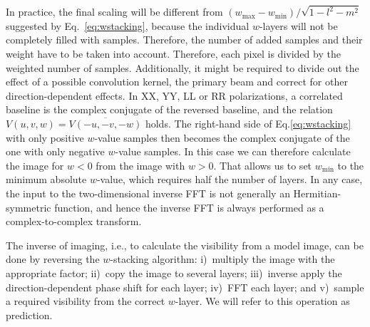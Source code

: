 \documentclass[useAMS,usenatbib]{mn2e}
\begin{document}
In practice, the final scaling will be different from $\left(w_{\max} - w_{\min}\right)/\sqrt{1-l^2-m^2}$ suggested by Eq.~\eqref{eq:wstacking}, because the individual $w$-layers will not be completely filled with samples. Therefore, the number of added samples and their weight have to be taken into account. Therefore, each pixel is divided by the weighted number of samples. Additionally, it might be required to divide out the effect of a possible convolution kernel, the primary beam and correct for other direction-dependent effects. In XX, YY, LL or RR polarizations, a correlated baseline is the complex conjugate of the reversed baseline, and the relation $V(u,v,w)=\overline{V(-u,-v,-w)}$ holds. The right-hand side of Eq.\eqref{eq:wstacking} with only positive $w$-value samples then becomes the complex conjugate of the one with only negative $w$-value samples. In this case we can therefore calculate the image for $w<0$ from the image with $w>0$. That allows us to set $w_{\min}$ to the minimum absolute $w$-value, which requires half the number of layers. In any case, the input to the two-dimensional inverse FFT is not generally an Hermitian-symmetric function, and hence the inverse FFT is always performed as a complex-to-complex transform.

The inverse of imaging, i.e., to calculate the visibility from a model image, can be done by reversing the $w$-stacking algorithm: i)~multiply the image with the appropriate factor; ii)~copy the image to several layers; iii)~inverse apply the direction-dependent phase shift for each layer; iv)~FFT each layer; and v)~sample a required visibility from the correct $w$-layer. We will refer to this operation as prediction.
\end{document}
